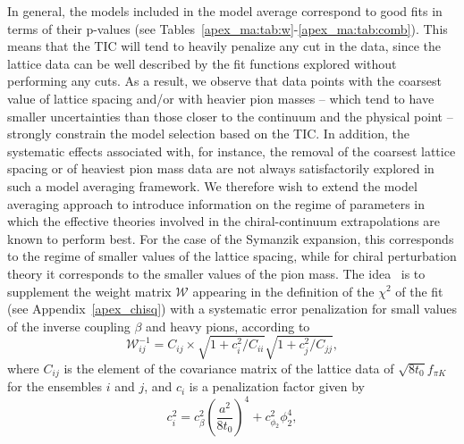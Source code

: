 In general, the models included in the model average correspond to good fits in terms of their p-values (see Tables~\ref{apex_ma:tab:w}-\ref{apex_ma:tab:comb}). This means that the TIC will tend to heavily penalize any cut in the data, since the lattice data can be well described by the fit functions explored without performing any cuts. As a result, we observe that data points with the coarsest value of lattice spacing and/or with heavier pion masses -- which tend to have smaller uncertainties than those closer to the continuum and the physical point -- strongly constrain the model selection based on the TIC. In addition, the systematic effects associated with, for instance, the removal of the coarsest lattice spacing or of heaviest pion mass data are not always satisfactorily explored in such a model averaging framework. We therefore wish to extend the model averaging approach to introduce information on the regime of parameters in which the effective theories involved in the chiral-continuum extrapolations are known to perform best. For the case of the Symanzik expansion, this corresponds to the regime of smaller values of the lattice spacing, while for chiral perturbation theory it corresponds to the smaller values of the pion mass. The idea~\citep{DallaBrida:2016kgh} is to supplement the weight matrix $\mathcal{W}$ appearing in the definition of the $\chi^2$ of the fit (see Appendix~\ref{apex_chisq}) with a systematic error penalization for small values of the inverse coupling $\beta$ and heavy pions, according to 
\begin{equation}
\label{ch_ss:eq:Wpenal}
\mathcal{W}_{ij}^{-1}=C_{ij}\times\sqrt{1+c_i^2/C_{ii}}\sqrt{1+c_j^2/C_{jj}},
\end{equation}
where $C_{ij}$ is the element of the covariance matrix of the lattice data of $\sqrt{8t_0}f_{\pi K}$ for the ensembles $i$ and $j$, and $c_i$ is a penalization factor given by
\begin{equation}
\label{ch_ss:eq:penal}
c_i^2=c_{\beta}^2\left(\frac{a^2}{8t_0}\right)^4+c_{\phi_2}^2\phi_2^4,
\end{equation}
